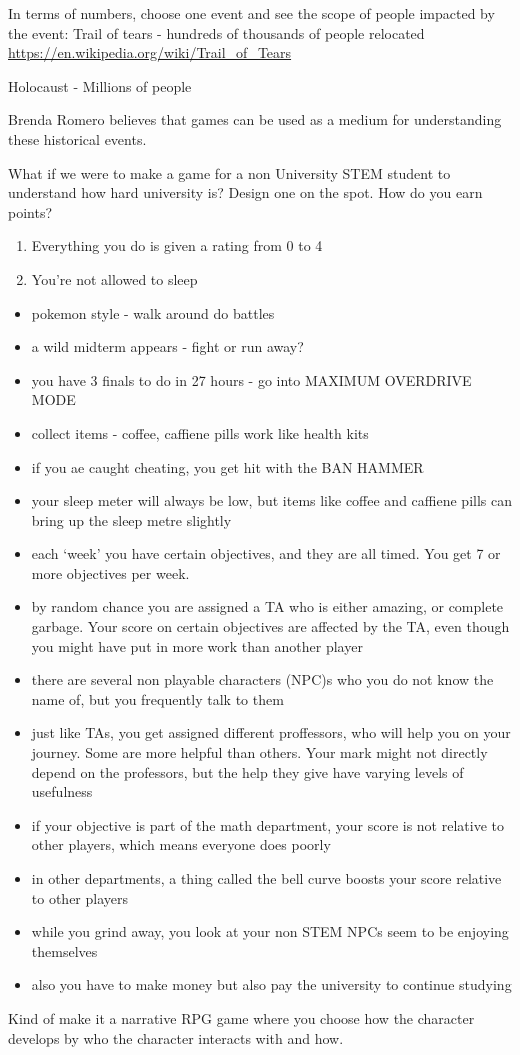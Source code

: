 \documentclass{article}
\begin{document}
In terms of numbers, choose one event and see the scope of people impacted by the event:
Trail of tears - hundreds of thousands of people relocated \url{https://en.wikipedia.org/wiki/Trail_of_Tears}

Holocaust - Millions of people


Brenda Romero believes that games can be used as a medium for understanding these historical events.


What if we were to make a game for a non University STEM student to understand how hard university is?
Design one on the spot. How do you earn points?

\begin{enumerate}
 \item Everything you do is given a rating from 0 to 4
 \item You're not allowed to sleep
\end{enumerate}

\begin{itemize}
 \item pokemon style - walk around do battles
 \item a wild midterm appears - fight or run away?
 \item you have 3 finals to do in 27 hours - go into MAXIMUM OVERDRIVE MODE
 \item collect items - coffee, caffiene pills work like health kits
 \item if you ae caught cheating, you get hit with the BAN HAMMER
 \item your sleep meter will always be low, but items like coffee and caffiene pills can bring up the sleep metre slightly
 \item each `week' you have certain objectives, and they are all timed. You get 7 or more objectives per week.
 \item by random chance you are assigned a TA who is either amazing, or complete garbage. Your score on certain objectives are affected by the TA,
       even though you might have put in more work than another player
 \item there are several non playable characters (NPC)s who you do not know the name of, but you frequently talk to them
 \item just like TAs, you get assigned different proffessors, who will help you on your journey. Some are more helpful than others.
       Your mark might not directly depend on the professors, but the help they give have varying levels of usefulness
 \item if your objective is part of the math department, your score is not relative to other players, which means
       everyone does poorly
 \item in other departments, a thing called the bell curve boosts your score relative to other players
 \item while you grind away, you look at your non STEM NPCs seem to be enjoying themselves
 \item also you have to make money but also pay the university to continue studying
\end{itemize}

Kind of make it a narrative RPG game where  you choose how the character develops by who the character interacts with and how.
\end{document}
